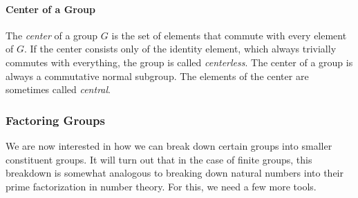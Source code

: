 


\paragraph{Center of a Group}
The \emph{center} of a group $G$ is the set of elements that commute with every element of $G$. If the center consists only of the identity element, which always trivially commutes with everything, the group is called \emph{centerless}. The center of a group is always a commutative normal subgroup. The elements of the center are sometimes called \emph{central}.





\subsubsection{Factoring Groups}
We are now interested in how we can break down certain groups into smaller constituent groups. It will turn out that in the case of finite groups, this breakdown is somewhat analogous to breaking down natural numbers into their prime factorization in number theory. For this, we need a few more tools.

